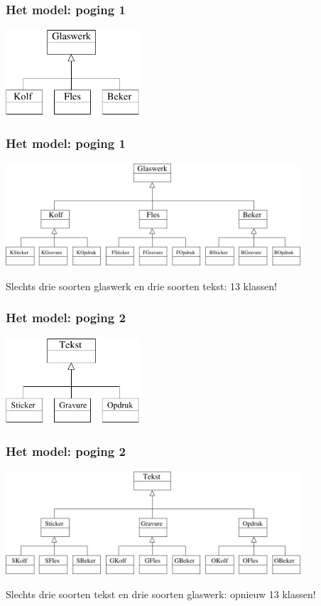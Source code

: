 \documentclass{beamer}
\begin{document}
\begin{frame}
\frametitle{Het model: poging 1}
\begin{center}
\includegraphics[width=5cm]{bridge1}
\end{center}
\end{frame}

\begin{frame}
\frametitle{Het model: poging 1}
\begin{center}
\includegraphics[width=11cm]{bridge2}
\end{center}
Slechts drie soorten glaswerk en drie soorten tekst: 13 klassen!
\end{frame}

\begin{frame}
\frametitle{Het model: poging 2}
\begin{center}
\includegraphics[width=5cm]{bridge3}
\end{center}
\end{frame}

\begin{frame}
\frametitle{Het model: poging 2}
\begin{center}
\includegraphics[width=11cm]{bridge4}
\end{center}
Slechts drie soorten tekst en drie soorten glaswerk: opnieuw 13 klassen!
\end{frame}
\end{document}
